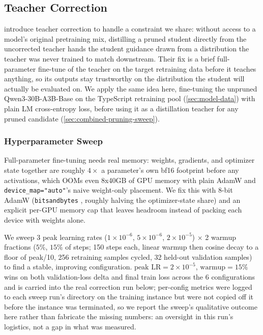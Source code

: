 \documentclass{article}
\theoremstyle{plain}
\theoremstyle{definition}
\theoremstyle{remark}
\begin{document}
\subsection{Teacher Correction}
\label{sec:teacher-correction}
\label{app:teacher-correction}

\citet{minitron2024practice} introduce teacher correction to handle a
constraint we share: without access to a model's original pretraining
mix, distilling a pruned student directly from the uncorrected teacher
hands the student guidance drawn from a distribution the teacher was
never trained to match downstream. Their fix is a brief full-parameter
fine-tune of the teacher on the target retraining data before it teaches
anything, so its outputs stay trustworthy on the distribution the student
will actually be evaluated on. We apply the same idea here, fine-tuning
the unpruned Qwen3-30B-A3B-Base on the TypeScript retraining pool
(\cref{sec:model-data}) with plain LM cross-entropy loss, before
using it as a distillation teacher for any pruned candidate
(\cref{sec:combined-pruning-sweep}).

\subsubsection{Hyperparameter Sweep}

Full-parameter fine-tuning needs real memory: weights, gradients, and
optimizer state together are roughly $4\times$ a parameter's own bf16
footprint before any activations, which OOMs even 8x40GB of GPU memory
with plain AdamW \cite{adamw2019} and \texttt{device\_map="auto"}'s naive
weight-only placement. We fix this with 8-bit AdamW (\texttt{bitsandbytes}
\cite{bitsandbytes2022}, roughly halving the optimizer-state share) and
an explicit per-GPU memory cap
that leaves headroom instead of packing each device with weights alone.

We sweep 3 peak learning rates ($1\times10^{-6}$, $5\times10^{-6}$,
$2\times10^{-5}$) $\times$ 2 warmup fractions ($5\%$, $15\%$ of steps;
150 steps each, linear warmup then cosine decay to a floor of peak/10,
256 retraining samples cycled, 32 held-out validation samples) to find a
stable, improving configuration. $\text{peak LR}=2\times10^{-5}$,
$\text{warmup}=15\%$ wins on both validation-loss delta and final train
loss across the 6 configurations and is carried into the real correction
run below; per-config metrics were logged to each sweep run's directory
on the training instance but were not copied off it before the instance
was terminated, so we report the sweep's qualitative outcome here rather
than fabricate the missing numbers: an oversight in this run's
logistics, not a gap in what was measured.
\end{document}
